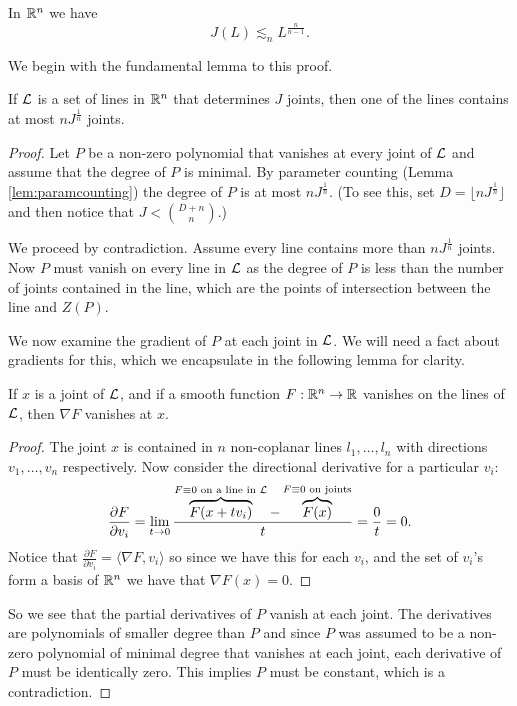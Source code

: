 \begin{theorem}
    In $\mathbb R^n$ we have
      $$J(L) \lesssim_n L^{\frac{n}{n-1}}.$$
\end{theorem}
We begin with the fundamental lemma to this proof. 
\begin{lemma}
    If $\mathcal L$ is a set of lines in $\mathbb R^n$ that determines $J$ joints, then one of the lines contains at most $nJ^{\frac{1}{n}}$ joints. \label{joints_bound}
\end{lemma}
\begin{proof}
Let $P$ be a non-zero polynomial that vanishes at every joint of $\mathcal L$ and assume that the degree of $P$ is minimal. By parameter counting (Lemma \ref{lem:paramcounting}) the degree of $P$ is at most 
$nJ^{\frac{1}{n}}$. (To see this, set $D = \lfloor nJ^{\frac{1}{n}}\rfloor$ and then notice that $J < {{D+n}\choose {n}}$.)

We proceed by contradiction. Assume every line contains more than $nJ^{\frac{1}{n}}$ joints.
 Now $P$ must vanish on every line in $\mathcal L$ as the degree of $P$ is less than the number of joints contained in the line, which are the points of intersection between the line and $Z(P)$. 

We now examine the gradient of $P$ at each joint in $\mathcal L$. We will need a fact about gradients for this, which we encapsulate in the following lemma for clarity.
\begin{lemma}
    If $x$ is a joint of $\mathcal L$, and if a smooth function $F: \mathbb R^n \to \mathbb R$ vanishes on the lines of $\mathcal L$, then $\nabla F$ vanishes at $x$. 
\end{lemma}
\begin{proof}
    The joint $x$ is contained in $n$ non-coplanar lines $l_1, \dots, l_n$ with directions $v_1, \dots , v_n$ respectively. 
    Now consider the directional derivative for a particular $v_i$:
    \[
    \frac{\partial F}{\partial v_i} = \lim_{t \to 0} \frac{ \overbrace{F(x+ tv_i)}^{F \equiv 0 \text{ on a line in $\mathcal L$}} - \overbrace{F(x)}^{F \equiv 0 \text{ on joints}}}{t} = \frac{0}{t} = 0.    
    \]
    Notice that $ \frac{\partial F}{\partial v_i} = \langle \nabla F, v_i\rangle$ so since we have this for each $v_i$, and the set of $v_i$'s form a basis of $\mathbb R^n$ we have that $\nabla F(x) = 0$.
\end{proof}
So we see that the partial derivatives of $P$ vanish at each joint. The derivatives are polynomials of
smaller degree than $P$ and since $P$ was assumed to be a non-zero polynomial of minimal degree that
vanishes at each joint, each derivative of $P$ must be identically zero. This implies $P$ must be
constant, which is 
a contradiction.
\end{proof}

